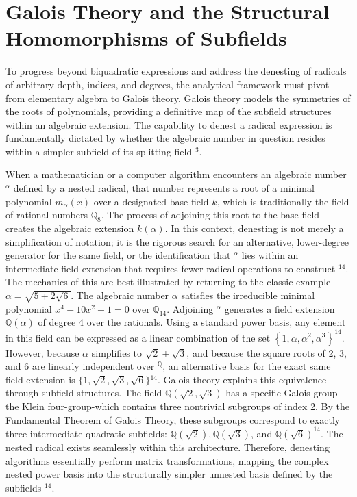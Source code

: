 \documentclass[10pt]{article}
\begin{document}
\section*{Galois Theory and the Structural Homomorphisms of Subfields}
To progress beyond biquadratic expressions and address the denesting of radicals of arbitrary depth, indices, and degrees, the analytical framework must pivot from elementary algebra to Galois theory. Galois theory models the symmetries of the roots of polynomials, providing a definitive map of the subfield structures within an algebraic extension. The capability to denest a radical expression is fundamentally dictated by whether the algebraic number in question resides within a simpler subfield of its splitting field ${ }^{3}$.

When a mathematician or a computer algorithm encounters an algebraic number ${ }^{\alpha}$ defined by a nested radical, that number represents a root of a minimal polynomial $m_{\alpha}(x)$ over a designated base field $k$, which is traditionally the field of rational numbers $\mathbb{Q}_{8}$. The process of adjoining this root to the base field creates the algebraic extension $k(\alpha)$. In this context, denesting is not merely a simplification of notation; it is the rigorous search for an alternative, lower-degree generator for the same field, or the identification that ${ }^{\alpha}$ lies within an intermediate field extension that requires fewer radical operations to construct ${ }^{14}$. The mechanics of this are best illustrated by returning to the classic example $\alpha=\sqrt{5+2 \sqrt{6}}$. The algebraic number $\alpha$ satisfies the irreducible minimal polynomial $x^{4}-10 x^{2}+1=0$ over $\mathbb{Q}_{14}$. Adjoining ${ }^{\alpha}$ generates a field extension $\mathbb{Q}(\alpha)$ of degree 4 over the rationals. Using a standard power basis, any element in this field can be expressed as a linear combination of the set $\left\{1, \alpha, \alpha^{2}, \alpha^{3}\right\}^{14}$. However, because $\alpha$ simplifies to $\sqrt{2}+\sqrt{3}$, and because the square roots of 2, 3, and 6 are linearly independent over ${ }^{\mathbb{Q}}$, an alternative basis for the exact same field extension is $\{1, \sqrt{2}, \sqrt{3}, \sqrt{6}\}{ }^{14}$. Galois theory explains this equivalence through subfield structures. The field $\mathbb{Q}(\sqrt{2}, \sqrt{3})$ has a specific Galois group-the Klein four-group-which contains three nontrivial subgroups of index 2. By the Fundamental Theorem of Galois Theory, these subgroups correspond to exactly three intermediate quadratic subfields: $\mathbb{Q}(\sqrt{2}), \mathbb{Q}(\sqrt{3})$, and $\mathbb{Q}(\sqrt{6})^{14}$. The nested radical exists seamlessly within this architecture. Therefore, denesting algorithms essentially perform matrix transformations, mapping the complex nested power basis into the structurally simpler unnested basis defined by the subfields ${ }^{14}$.
\end{document}
